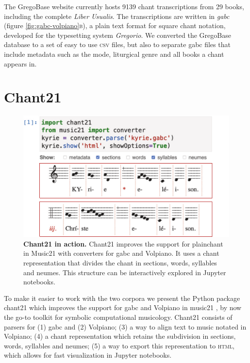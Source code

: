 \documentclass[sigconf,screen]{acmart}
\begin{document}
The GregoBase website currently hosts 9139 chant transcriptions from 29 books, including the complete \emph{Liber Usualis}.
The transcriptions are written in \emph{gabc} (figure \ref{fig:gabc-volpiano}\textsc{b}), a plain text format for square chant notation, developed 
for the typesetting system \emph{Gregorio}.
We converted the GregoBase database to a set of easy to use \textsc{csv} files, but also to separate gabc files that include metadata such as the mode, liturgical genre and all books a chant appears in.




\section{Chant21}\label{sec:chant21}


\begin{figure}[t]
    \includegraphics[width=\linewidth]{figures/fig02-chant21.pdf}
    \caption{\normalfont%
    \textbf{Chant21 in action.}
    Chant21 improves the support for plainchant in Music21 with converters for gabc and Volpiano.
    It uses a chant representation that divides the chant in sections, words, syllables and neumes.
    This structure can be interactively explored in Jupyter notebooks.
    }%
    \label{fig:chant21-in-action}
\end{figure}


To make it easier to work with the two corpora we present the Python package chant21 which improves the support for gabc and Volpiano in music21 \cite{Cuthbert2010}, by now the go-to toolkit for symbolic computational musicology.
Chant21 consists of parsers for (1) gabc and (2) Volpiano; (3) a way to align text to music notated in  Volpiano; (4) a chant representation which retains the subdivision in sections, words, syllables and neumes; (5) a way to export this representation to \textsc{html}, which allows for fast visualization in Jupyter notebooks.
\end{document}

